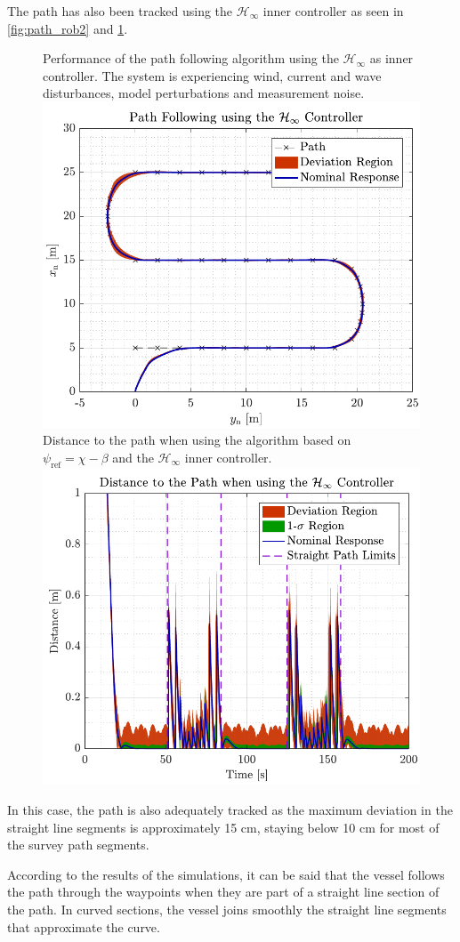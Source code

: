 The path has also been tracked using the $\mathcal{H}_\infty$ inner controller as seen in \autoref{fig:path_rob2} and \ref{fig:dist_rob2}.
\begin{figure}[H]
    \captionbox 
    {   
        Performance of the path following algorithm using the $\mathcal{H}_\infty$ as inner controller. The system is experiencing wind, current and wave disturbances, model perturbations and measurement noise. \label{fig:path_rob2}
    }                                                                 
    {                                                                  
        \includegraphics[width=.45\textwidth]{figures/path_rob}         
    }                                                                    
    \hspace{5pt}                                                          
    \captionbox  
    {      
        Distance to the path when using the algorithm based on $\psi_\mathrm{ref}=\chi-\beta$ and the $\mathcal{H}_\infty$ inner controller. \label{fig:dist_rob2}
    }                                                                          
    {
        \includegraphics[width=.45\textwidth]{figures/dist_rob}
    }
\end{figure}
In this case, the path is also adequately tracked as the maximum deviation in the straight line segments is approximately 15 cm, staying below 10 cm for most of the survey path segments.

According to the results of the simulations, it can be said that the vessel follows the path through the waypoints when they are part of a straight line section of the path. In curved sections, the vessel joins smoothly the straight line segments that approximate the curve. 

